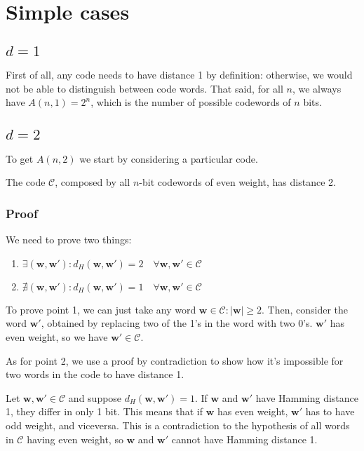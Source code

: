 \section{Simple cases}
\subsection*{$d=1$}
First of all, any code needs to have distance 1 by definition: otherwise, we would not be able to distinguish between code words. That said, for all $n$, we always have $A(n,1) = 2^n$, which is the number of possible codewords of $n$ bits.

\subsection*{$d=2$}
To get $A(n,2)$ we start by considering a particular code.
\begin{lemma}
    The code $\mathcal{C}$, composed by all $n$-bit codewords of even weight, has distance 2.
\end{lemma}
\subsubsection*{Proof}
We need to prove two things:
\begin{enumerate}
    \item $\exists (\mathbf{w},\mathbf{w}') : d_H(\mathbf{w},\mathbf{w}')=2\quad\forall \mathbf{w},\mathbf{w}' \in \mathcal{C}$
    \item $\nexists (\mathbf{w},\mathbf{w}') : d_H(\mathbf{w},\mathbf{w}')=1\quad\forall \mathbf{w},\mathbf{w}' \in \mathcal{C}$
\end{enumerate}

To prove point 1, we can just take any word $\mathbf{w}\in \mathcal{C}:|\mathbf{w}|\geq 2$. Then, consider the word $\mathbf{w}'$, obtained by replacing two of the 1's in the word with two 0's.
$\mathbf{w}'$ has even weight, so we have $\mathbf{w}' \in \mathcal{C}$.

As for point 2, we use a proof by contradiction to show how it's impossible for two words in the code to have distance 1.

Let $\mathbf{w},\mathbf{w}' \in \mathcal{C}$ and suppose $d_H(\mathbf{w},\mathbf{w}')=1$. If $\mathbf{w}$ and $\mathbf{w}'$ have Hamming distance 1, they differ in only 1 bit.
This means that if $\mathbf{w}$ has even weight, $\mathbf{w}'$ has to have odd weight, and viceversa. This is a contradiction to the hypothesis of all words in $\mathcal{C}$ having even weight, so $\mathbf{w}$ and $\mathbf{w}'$ cannot have Hamming distance 1.

